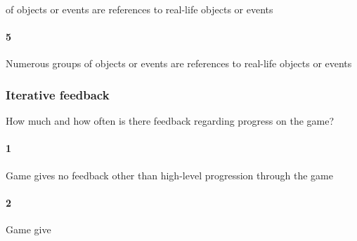  of objects or events are references to real-life objects or events\paragraph{5}Numerous groups of objects or events are references to real-life objects or events\subsubsection{Iterative feedback}How much and how often is there feedback regarding progress on the game?\paragraph{1}Game gives no feedback other than high-level progression through the game\paragraph{2}Game give